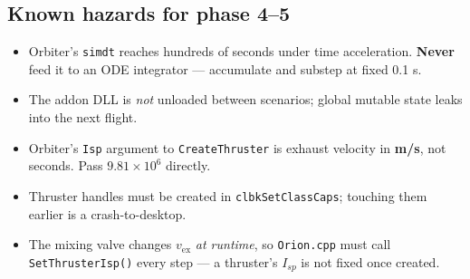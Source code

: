 \documentclass[11pt]{article}
\newcommand{\ve}{v_{\text{ex}}}
\begin{document}
\subsection*{Known hazards for phase 4--5}
\begin{itemize}\itemsep0pt
\item Orbiter's \texttt{simdt} reaches hundreds of seconds under time acceleration. \textbf{Never} feed it to an ODE integrator --- accumulate and substep at fixed 0.1 s.
\item The addon DLL is \emph{not} unloaded between scenarios; global mutable state leaks into the next flight.
\item Orbiter's \texttt{Isp} argument to \texttt{CreateThruster} is exhaust velocity in \textbf{m/s}, not seconds. Pass $9.81\times10^{6}$ directly.
\item Thruster handles must be created in \texttt{clbkSetClassCaps}; touching them earlier is a crash-to-desktop.
\item The mixing valve changes $\ve$ \emph{at runtime}, so \texttt{Orion.cpp} must call \texttt{SetThrusterIsp()} every step --- a thruster's $I_{sp}$ is not fixed once created.
\end{itemize}
\end{document}
